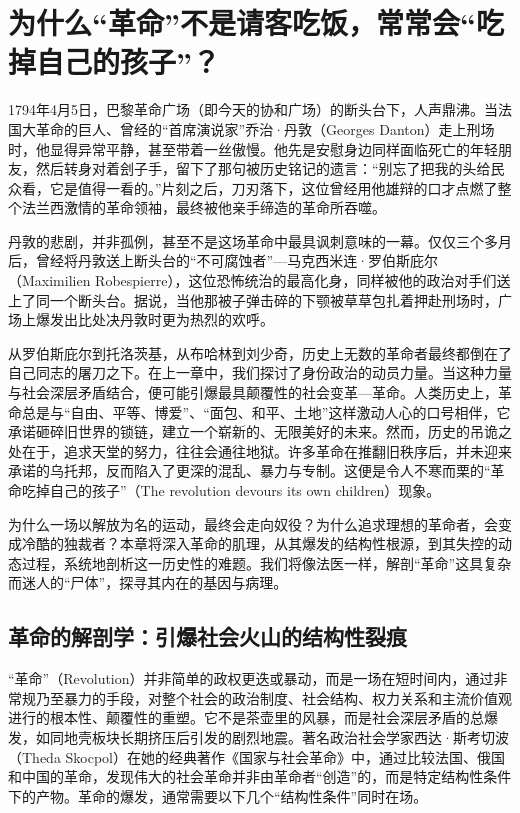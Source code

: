 \chapter{为什么“革命”不是请客吃饭，常常会“吃掉自己的孩子”？}

1794年4月5日，巴黎革命广场（即今天的协和广场）的断头台下，人声鼎沸。当法国大革命的巨人、曾经的“首席演说家”乔治·丹敦（Georges Danton）走上刑场时，他显得异常平静，甚至带着一丝傲慢。他先是安慰身边同样面临死亡的年轻朋友，然后转身对着刽子手，留下了那句被历史铭记的遗言：“别忘了把我的头给民众看，它是值得一看的。”片刻之后，刀刃落下，这位曾经用他雄辩的口才点燃了整个法兰西激情的革命领袖，最终被他亲手缔造的革命所吞噬。

丹敦的悲剧，并非孤例，甚至不是这场革命中最具讽刺意味的一幕。仅仅三个多月后，曾经将丹敦送上断头台的“不可腐蚀者”---马克西米连·罗伯斯庇尔（Maximilien Robespierre），这位恐怖统治的最高化身，同样被他的政治对手们送上了同一个断头台。据说，当他那被子弹击碎的下颚被草草包扎着押赴刑场时，广场上爆发出比处决丹敦时更为热烈的欢呼。

从罗伯斯庇尔到托洛茨基，从布哈林到刘少奇，历史上无数的革命者最终都倒在了自己同志的屠刀之下。在上一章中，我们探讨了身份政治的动员力量。当这种力量与社会深层矛盾结合，便可能引爆最具颠覆性的社会变革---革命。人类历史上，革命总是与“自由、平等、博爱”、“面包、和平、土地”这样激动人心的口号相伴，它承诺砸碎旧世界的锁链，建立一个崭新的、无限美好的未来。然而，历史的吊诡之处在于，追求天堂的努力，往往会通往地狱。许多革命在推翻旧秩序后，并未迎来承诺的乌托邦，反而陷入了更深的混乱、暴力与专制。这便是令人不寒而栗的“革命吃掉自己的孩子”（The revolution devours its own children）现象。

为什么一场以解放为名的运动，最终会走向奴役？为什么追求理想的革命者，会变成冷酷的独裁者？本章将深入革命的肌理，从其爆发的结构性根源，到其失控的动态过程，系统地剖析这一历史性的难题。我们将像法医一样，解剖“革命”这具复杂而迷人的“尸体”，探寻其内在的基因与病理。

\section{革命的解剖学：引爆社会火山的结构性裂痕}

“革命”（Revolution）并非简单的政权更迭或暴动，而是一场在短时间内，通过非常规乃至暴力的手段，对整个社会的政治制度、社会结构、权力关系和主流价值观进行的根本性、颠覆性的重塑。它不是茶壶里的风暴，而是社会深层矛盾的总爆发，如同地壳板块长期挤压后引发的剧烈地震。著名政治社会学家西达·斯考切波（Theda Skocpol）在她的经典著作《国家与社会革命》中，通过比较法国、俄国和中国的革命，发现伟大的社会革命并非由革命者“创造”的，而是特定结构性条件下的产物。革命的爆发，通常需要以下几个“结构性条件”同时在场。

